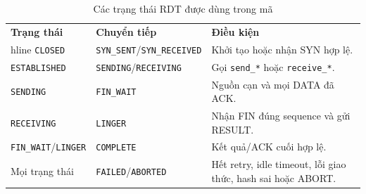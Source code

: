 \begin{table}[H]\centering\small
\begin{tabular}{|p{3cm}|p{3cm}|p{7cm}|}\hline
\textbf{Trạng thái}&\textbf{Chuyển tiếp}&\textbf{Điều kiện}\
\\hline
\texttt{CLOSED}&\texttt{SYN\_SENT}/\texttt{SYN\_RECEIVED}&Khởi tạo hoặc nhận SYN hợp lệ.\\\hline
\texttt{ESTABLISHED}&\texttt{SENDING}/\texttt{RECEIVING}&Gọi \texttt{send\_*} hoặc \texttt{receive\_*}.\\\hline
\texttt{SENDING}&\texttt{FIN\_WAIT}&Nguồn cạn và mọi DATA đã ACK.\\\hline
\texttt{RECEIVING}&\texttt{LINGER}&Nhận FIN đúng sequence và gửi RESULT.\\\hline
\texttt{FIN\_WAIT}/\texttt{LINGER}&\texttt{COMPLETE}&Kết quả/ACK cuối hợp lệ.\\\hline
Mọi trạng thái&\texttt{FAILED}/\texttt{ABORTED}&Hết retry, idle timeout, lỗi giao thức, hash sai hoặc ABORT.\\\hline
\end{tabular}\caption{Các trạng thái RDT được dùng trong mã}\end{table}
